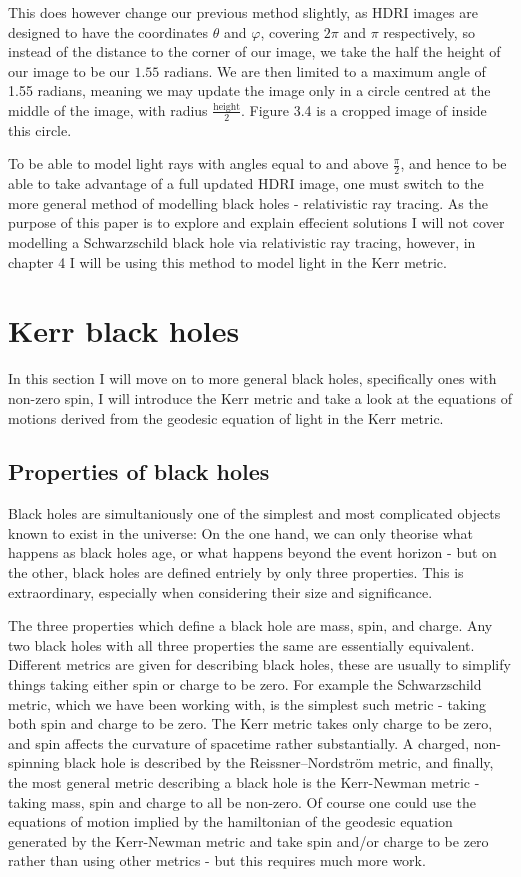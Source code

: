 \documentclass[oneside,openright,frontopenright]{dmathesis}
\begin{document}
	This does however change our previous method slightly, as HDRI images are designed to have the coordinates $\theta$ and $\varphi$, covering $2\pi$ and $\pi$ respectively, so instead of the distance to the corner of our image, we take the half the height of our image to be our $1.55$ radians. We are then limited to a maximum angle of 1.55 radians, meaning we may update the image only in a circle centred at the middle of the image, with radius $\frac{\mbox{height}}{2}$. Figure 3.4 is a cropped image of inside this circle.

	To be able to model light rays with angles equal to and above $\frac{\pi}{2}$, and hence to be able to take advantage of a full updated HDRI image, one must switch to the more general method of modelling black holes - relativistic ray tracing. As the purpose of this paper is to explore and explain effecient solutions I will not cover modelling a Schwarzschild black hole via relativistic ray tracing, however, in chapter 4 I will be using this method to model light in the Kerr metric.


\chapter{Kerr black holes}

	In this section I will move on to more general black holes, specifically ones with non-zero spin, I will introduce the Kerr metric and take a look at the equations of motions derived from the geodesic equation of light in the Kerr metric.

\section{Properties of black holes}

	Black holes are simultaniously one of the simplest and most complicated objects known to exist in the universe: On the one hand, we can only theorise what happens as black holes age, or what happens beyond the event horizon - but on the other, black holes are defined entriely by only three properties. This is extraordinary, especially when considering their size and significance.

	The three properties which define a black hole are mass, spin, and charge. Any two black holes with all three properties the same are essentially equivalent. Different metrics are given for describing black holes, these are usually to simplify things taking either spin or charge to be zero. For example the Schwarzschild metric, which we have been working with, is the simplest such metric - taking both spin and charge to be zero. The Kerr metric takes only charge to be zero, and spin affects the curvature of spacetime rather substantially. A charged, non-spinning black hole is described by the Reissner–Nordström metric, and finally, the most general metric describing a black hole is the Kerr-Newman metric - taking mass, spin and charge to all be non-zero. Of course one could use the equations of motion implied by the hamiltonian of the geodesic equation generated by the Kerr-Newman metric and take spin and/or charge to be zero rather than using other metrics - but this requires much more work.
\end{document}
